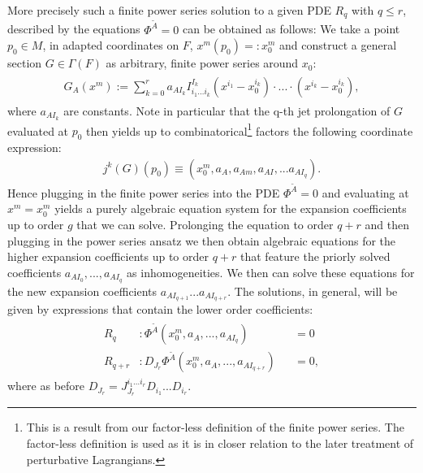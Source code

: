 \documentclass[a4paper,12pt, DIV=14, BCOR=5mm, twoside, headsepline, numbers=noenddot]{scrbook}
\begin{document}
More precisely such a finite power series solution to a given PDE $R_q$ with $q\leq r$, described by the equations $\Phi^{\tilde{A}} = 0$ can be obtained as follows: We take a point $p_0 \in M$, in adapted coordinates on $F$, $x^m(p_0) =: x_0^m$ and construct a general section $G\in\Gamma(F)$ as arbitrary, finite power series around $x_0$:
\begin{align}
\begin{aligned}
    G_A(x^m) :=  \sum_{k=0}^{r} a_{AI_k}I^{I_k}_{i_1...i_k}(x^{i_1}-x_0^{i_k}) \cdot ... \cdot (x^{i_k}- x_0^{i_k}), 
\end{aligned}
\end{align}
where $a_{AI_k}$ are constants. Note in particular that the q-th jet prolongation of $G$ evaluated at $p_0$ then yields up to combinatorical\footnote{This is a result from our factor-less definition of the finite power series. The factor-less definition is used as it is in closer relation to the later treatment of perturbative Lagrangians.} factors the following coordinate expression:
\begin{align}
    j^k(G)(p_0) \equiv \left ( x_0^m, a_A, a_{Am}, a_{AI}, ... a_{AI_q} \right ).
\end{align}
Hence plugging in the finite power series into the PDE $\Phi^{\tilde{A}} =0$ and evaluating at $x^m=x^m_0$ yields a purely algebraic equation system for the expansion coefficients up to order $g$ that we can solve. Prolonging the equation to order $q+r$ and then plugging in the power series ansatz we then obtain algebraic equations for the higher expansion coefficients up to order $q+r$ that feature the priorly solved coefficients $a_{AI_0},...,a_{AI_q}$ as inhomogeneities. We then can solve these equations for the new expansion coefficients $a_{AI_{q+1}}...a_{AI_{q+r}}$. The solutions, in general, will be given by expressions that contain the lower order coefficients:
\begin{align}
\begin{aligned}
R_q &: \Phi^{\tilde{A}}(x_0^m,a_A,...,a_{AI_q}) &&= 0 \\
R_{q+r} &:  D_{J_r}\Phi^{\tilde{A}}(x_0^m,a_A,...,a_{AI_{q+r}}) &&= 0,
\end{aligned}
\end{align}
where as before $D_{J_r} = J^{i_1...i_r}_{J_r} D_{i_1} ... D_{i_r}$.
\end{document}
